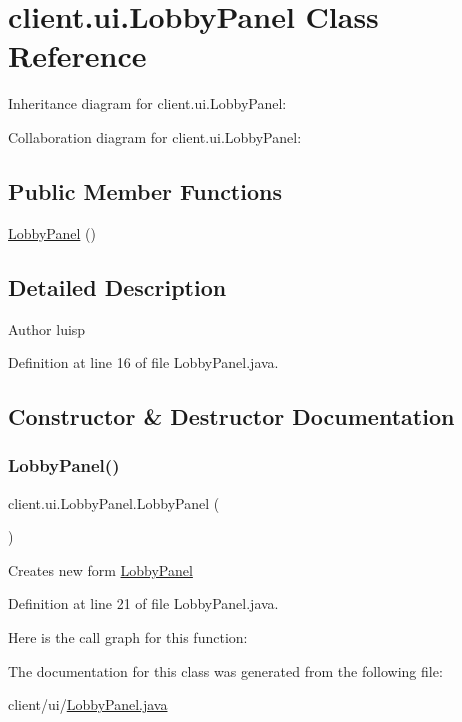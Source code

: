 \hypertarget{classclient_1_1ui_1_1_lobby_panel}{}\section{client.\+ui.\+Lobby\+Panel Class Reference}
\label{classclient_1_1ui_1_1_lobby_panel}


Inheritance diagram for client.\+ui.\+Lobby\+Panel\+:


Collaboration diagram for client.\+ui.\+Lobby\+Panel\+:
\subsection*{Public Member Functions}
\begin{DoxyCompactItemize}
\item 
\hyperlink{classclient_1_1ui_1_1_lobby_panel_aa6432c40dfb52b11101ab3e1e7fbb30c}{Lobby\+Panel} ()
\end{DoxyCompactItemize}


\subsection{Detailed Description}
\begin{DoxyAuthor}{Author}
luisp 
\end{DoxyAuthor}


Definition at line 16 of file Lobby\+Panel.\+java.



\subsection{Constructor \& Destructor Documentation}
\hypertarget{classclient_1_1ui_1_1_lobby_panel_aa6432c40dfb52b11101ab3e1e7fbb30c}{}\label{classclient_1_1ui_1_1_lobby_panel_aa6432c40dfb52b11101ab3e1e7fbb30c} 
\subsubsection{\texorpdfstring{Lobby\+Panel()}{LobbyPanel()}}
{\footnotesize\ttfamily client.\+ui.\+Lobby\+Panel.\+Lobby\+Panel (\begin{DoxyParamCaption}{ }\end{DoxyParamCaption})}

Creates new form \hyperlink{classclient_1_1ui_1_1_lobby_panel}{Lobby\+Panel} 

Definition at line 21 of file Lobby\+Panel.\+java.

Here is the call graph for this function\+:


The documentation for this class was generated from the following file\+:\begin{DoxyCompactItemize}
\item 
client/ui/\hyperlink{_lobby_panel_8java}{Lobby\+Panel.\+java}\end{DoxyCompactItemize}
